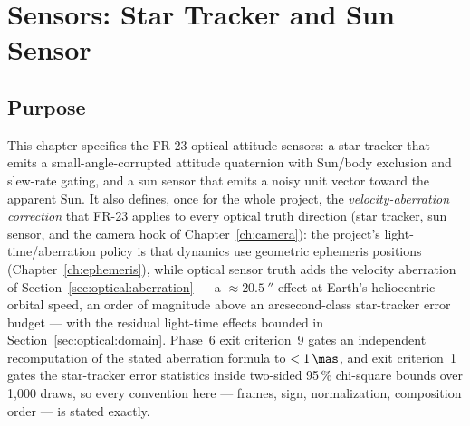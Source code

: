 \chapter{Sensors: Star Tracker and Sun Sensor}
\label{ch:sensors-optical}

\section{Purpose}
\label{sec:optical:purpose}

This chapter specifies the FR-23 optical attitude sensors: a star tracker
that emits a small-angle-corrupted attitude quaternion with Sun/body
exclusion and slew-rate gating, and a sun sensor that emits a noisy unit
vector toward the apparent Sun. It also defines, once for the whole
project, the \emph{velocity-aberration correction} that FR-23 applies to
every optical truth direction (star tracker, sun sensor, and the camera
hook of Chapter~\ref{ch:camera}): the project's light-time/aberration
policy is that dynamics use geometric ephemeris positions
(Chapter~\ref{ch:ephemeris}), while optical sensor truth adds the
velocity aberration of Section~\ref{sec:optical:aberration} --- a
$\approx \qty{20.5}{\arcsecond}$ effect at Earth's heliocentric orbital
speed, an order of magnitude above an arcsecond-class star-tracker error
budget --- with the residual light-time effects bounded in
Section~\ref{sec:optical:domain}. Phase~6 exit criterion~9 gates an
independent recomputation of the stated aberration formula to
$< \qty{1}{\mas}$, and exit criterion~1 gates the star-tracker error
statistics inside two-sided 95\,\% chi-square bounds over 1{,}000 draws,
so every convention here --- frames, sign, normalization, composition
order --- is stated exactly.

